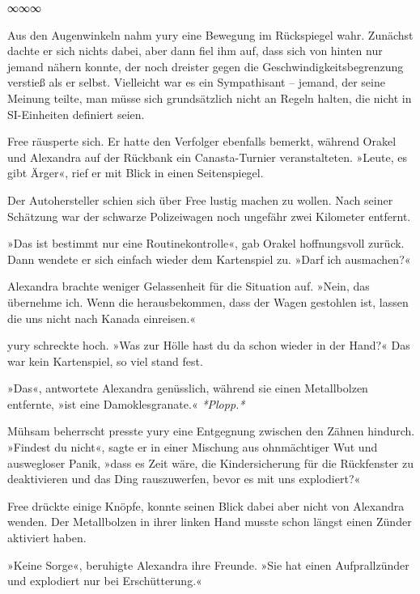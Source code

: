 \begin{center}
	∞∞∞
\end{center}

Aus den Augenwinkeln nahm yury eine Bewegung im Rückspiegel wahr. Zunächst dachte er sich nichts dabei, aber dann fiel ihm auf, dass sich von hinten nur jemand nähern konnte, der noch dreister gegen die Geschwindigkeitsbegrenzung verstieß als er selbst. Vielleicht war es ein Sympathisant – jemand, der seine Meinung teilte, man müsse sich grundsätzlich nicht an Regeln halten, die nicht in SI-Einheiten definiert seien.

Free räusperte sich. Er hatte den Verfolger ebenfalls bemerkt, während Orakel und Alexandra auf der Rückbank ein Canasta-Turnier veranstalteten. »Leute, es gibt Ärger«, rief er mit Blick in einen Seitenspiegel.

 Der Autohersteller schien sich über Free lustig machen zu wollen. Nach seiner Schätzung war der schwarze Polizeiwagen noch ungefähr zwei Kilometer entfernt.

»Das ist bestimmt nur eine Routinekontrolle«, gab Orakel hoffnungsvoll zurück. Dann wendete er sich einfach wieder dem Kartenspiel zu. »Darf ich ausmachen?«

Alexandra brachte weniger Gelassenheit für die Situation auf. »Nein, das übernehme ich. Wenn die herausbekommen, dass der Wagen gestohlen ist, lassen die uns nicht nach Kanada einreisen.«

yury schreckte hoch. »Was zur Hölle hast du da schon wieder in der Hand?« Das war kein Kartenspiel, so viel stand fest.

»Das«, antwortete Alexandra genüsslich, während sie einen Metallbolzen entfernte, »ist eine Damoklesgranate.« \textit{*Plopp.*}

Mühsam beherrscht presste yury eine Entgegnung zwischen den Zähnen hindurch. »Findest du nicht«, sagte er in einer Mischung aus ohnmächtiger Wut und auswegloser Panik, »dass es Zeit wäre, die Kindersicherung für die Rückfenster zu deaktivieren und das Ding rauszuwerfen, bevor es mit uns explodiert?«

Free drückte einige Knöpfe, konnte seinen Blick dabei aber nicht von Alexandra wenden. Der Metallbolzen in ihrer linken Hand musste schon längst einen Zünder aktiviert haben.

»Keine Sorge«, beruhigte Alexandra ihre Freunde. »Sie hat einen Aufprallzünder und explodiert nur bei Erschütterung.«

